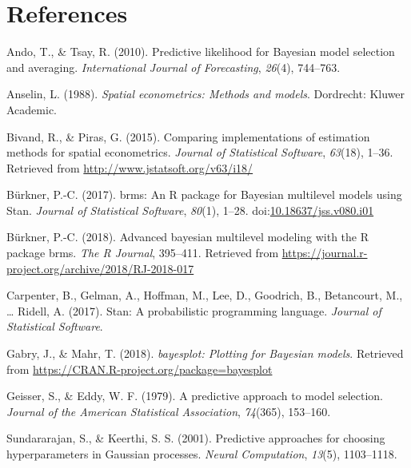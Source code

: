 \documentclass[english,,doc,floatsintext]{apa6}
\theoremstyle{definition}
\theoremstyle{definition}
\theoremstyle{definition}
\theoremstyle{remark}
\begin{document}
\hypertarget{references}{%
\section*{References}\label{references}}

\hypertarget{refs}{}
\leavevmode\hypertarget{ref-ando2010}{}%
Ando, T., \& Tsay, R. (2010). Predictive likelihood for Bayesian model
selection and averaging. \emph{International Journal of Forecasting},
\emph{26}(4), 744--763.

\leavevmode\hypertarget{ref-anselin1988}{}%
Anselin, L. (1988). \emph{Spatial econometrics: Methods and models}.
Dordrecht: Kluwer Academic.

\leavevmode\hypertarget{ref-bivand2015}{}%
Bivand, R., \& Piras, G. (2015). Comparing implementations of estimation
methods for spatial econometrics. \emph{Journal of Statistical
Software}, \emph{63}(18), 1--36. Retrieved from
\url{http://www.jstatsoft.org/v63/i18/}

\leavevmode\hypertarget{ref-brms1}{}%
Bürkner, P.-C. (2017). brms: An R package for Bayesian multilevel models
using Stan. \emph{Journal of Statistical Software}, \emph{80}(1), 1--28.
doi:\href{https://doi.org/10.18637/jss.v080.i01}{10.18637/jss.v080.i01}

\leavevmode\hypertarget{ref-brms2}{}%
Bürkner, P.-C. (2018). Advanced bayesian multilevel modeling with the R
package brms. \emph{The R Journal}, 395--411. Retrieved from
\url{https://journal.r-project.org/archive/2018/RJ-2018-017}

\leavevmode\hypertarget{ref-carpenter2017}{}%
Carpenter, B., Gelman, A., Hoffman, M., Lee, D., Goodrich, B.,
Betancourt, M., \ldots{} Ridell, A. (2017). Stan: A probabilistic
programming language. \emph{Journal of Statistical Software}.

\leavevmode\hypertarget{ref-bayesplot}{}%
Gabry, J., \& Mahr, T. (2018). \emph{bayesplot: Plotting for Bayesian
models}. Retrieved from
\url{https://CRAN.R-project.org/package=bayesplot}

\leavevmode\hypertarget{ref-geisser1979}{}%
Geisser, S., \& Eddy, W. F. (1979). A predictive approach to model
selection. \emph{Journal of the American Statistical Association},
\emph{74}(365), 153--160.

\leavevmode\hypertarget{ref-sundararajan2001}{}%
Sundararajan, S., \& Keerthi, S. S. (2001). Predictive approaches for
choosing hyperparameters in Gaussian processes. \emph{Neural
Computation}, \emph{13}(5), 1103--1118.
\end{document}
